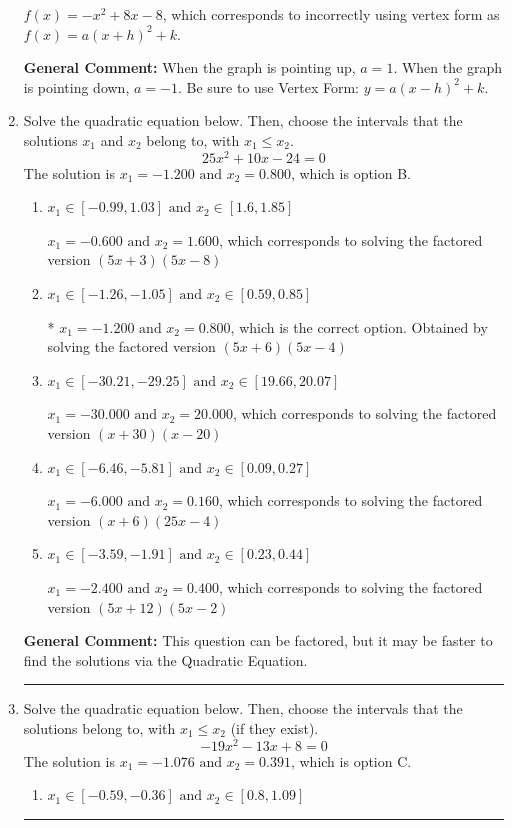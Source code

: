 \documentclass{extbook}[14pt]
\newcommand{\litem}[1]{\item #1

\rule{\textwidth}{0.4pt}}
\begin{document}
\begin{enumerate}
{\begin{enumerate}[label=\Alph*.]
$f(x)=-x^{2} +8 x -8$, which corresponds to incorrectly using vertex form as $f(x) = a(x+h)^2+k$.
\end{enumerate}

\textbf{General Comment:} When the graph is pointing up, $a=1$. When the graph is pointing down, $a=-1$. Be sure to use Vertex Form: $y = a(x-h)^2+k$.
}
\litem{
Solve the quadratic equation below. Then, choose the intervals that the solutions $x_1$ and $x_2$ belong to, with $x_1 \leq x_2$.
\[ 25x^{2} +10 x -24 = 0 \]The solution is \( x_1 = -1.200 \text{ and } x_2 = 0.800 \), which is option B.\begin{enumerate}[label=\Alph*.]
\item \( x_1 \in [-0.99, 1.03] \text{ and } x_2 \in [1.6, 1.85] \)

$x_1 = -0.600 \text{ and } x_2 = 1.600$, which corresponds to solving the factored version $(5x + 3)(5x -8)$
\item \( x_1 \in [-1.26, -1.05] \text{ and } x_2 \in [0.59, 0.85] \)

* $x_1 = -1.200 \text{ and } x_2 = 0.800$, which is the correct option. Obtained by solving the factored version $(5x + 6)(5x -4)$
\item \( x_1 \in [-30.21, -29.25] \text{ and } x_2 \in [19.66, 20.07] \)

$x_1 = -30.000 \text{ and } x_2 = 20.000$, which corresponds to solving the factored version $(x + 30)(x -20)$
\item \( x_1 \in [-6.46, -5.81] \text{ and } x_2 \in [0.09, 0.27] \)

$x_1 = -6.000 \text{ and } x_2 = 0.160$, which corresponds to solving the factored version $(x + 6)(25x -4)$
\item \( x_1 \in [-3.59, -1.91] \text{ and } x_2 \in [0.23, 0.44] \)

$x_1 = -2.400 \text{ and } x_2 = 0.400$, which corresponds to solving the factored version $(5x + 12)(5x -2)$
\end{enumerate}

\textbf{General Comment:} This question can be factored, but it may be faster to find the solutions via the Quadratic Equation.
}
\litem{
Solve the quadratic equation below. Then, choose the intervals that the solutions belong to, with $x_1 \leq x_2$ (if they exist).
\[ -19x^{2} -13 x + 8 = 0 \]The solution is \( x_1 = -1.076 \text{ and } x_2 = 0.391 \), which is option C.\begin{enumerate}[label=\Alph*.]
\item \( x_1 \in [-0.59, -0.36] \text{ and } x_2 \in [0.8, 1.09] \)


\end{enumerate}}
\end{enumerate}
\end{document}
